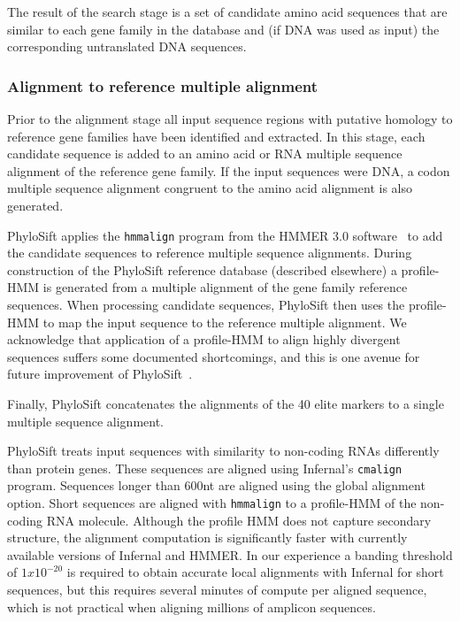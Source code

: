 \documentclass[10pt]{article}
\begin{document}
The result of the search stage is a set of candidate amino acid sequences that are similar to each gene family in the database and (if {DNA} was used as input) the corresponding untranslated {DNA} sequences.

\subsubsection*{Alignment to reference multiple alignment}
Prior to the alignment stage all input sequence regions with putative homology to reference gene families have been identified and extracted.
In this stage, each candidate sequence is added to an amino acid or {RNA} multiple sequence alignment of the reference gene family.
If the input sequences were {DNA}, a codon multiple sequence alignment congruent to the amino acid alignment is also generated.

PhyloSift applies the \texttt{hmmalign} program from the HMMER 3.0 software~\cite{Eddy2011} to add the candidate sequences to reference multiple sequence alignments.
During construction of the PhyloSift reference database (described elsewhere) a profile-HMM is generated from a multiple alignment of the gene family reference sequences.
When processing candidate sequences, PhyloSift then uses the profile-HMM to map the input sequence to the reference multiple alignment.
We acknowledge that application of a profile-HMM to align highly divergent sequences suffers some documented shortcomings, and this is one avenue for future improvement of PhyloSift~\cite{Loytynoja2012}.

Finally, PhyloSift concatenates the alignments of the 40 elite markers to a single multiple sequence alignment.

PhyloSift treats input sequences with similarity to non-coding {RNA}s differently than protein genes.
These sequences are aligned using Infernal's \texttt{cmalign} program.
Sequences longer than 600nt are aligned using the global alignment option.
Short sequences are aligned with \texttt{hmmalign} to a profile-HMM of the non-coding RNA molecule.
Although the profile HMM does not capture secondary structure, the alignment computation is significantly faster with currently available versions of Infernal and HMMER. 
In our experience a banding threshold of $1x10^{-20}$ is required to obtain accurate local alignments with Infernal for short sequences, but this requires several minutes of compute per aligned sequence, which is not practical when aligning millions of amplicon sequences.
\end{document}
